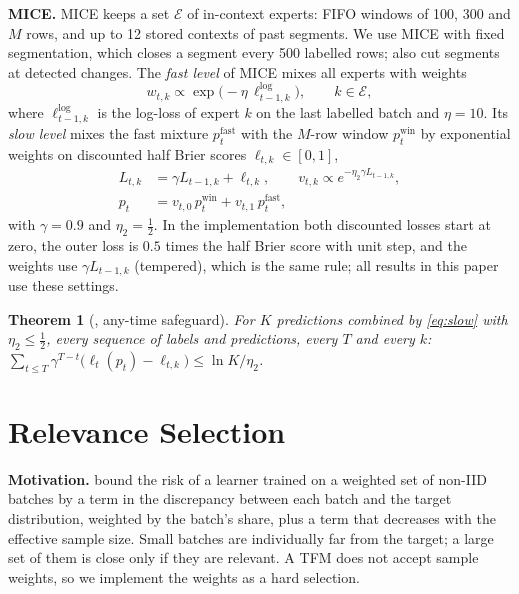 \documentclass{article}
\theoremstyle{plain}
\newtheorem{theorem}{Theorem}
\theoremstyle{definition}
\theoremstyle{remark}
\newcommand{\mice}{\textsc{MICE}}
\begin{document}
\textbf{\mice{}.} \mice{} \citep{mice2026} keeps a set $\mathcal E$ of in-context experts: FIFO windows of 100, 300 and
$M$ rows, and up to 12 stored contexts of past segments. We use \mice{} with fixed segmentation, which closes a
segment every 500 labelled rows; \citet{mice2026} also cut segments at detected changes. The \emph{fast level} of \mice{} mixes all experts with weights
\begin{equation}\label{eq:fast}
  w_{t,k}\propto\exp\bigl(-\eta\,\ell^{\log}_{t-1,k}\bigr),\qquad k\in\mathcal E,
\end{equation}
where $\ell^{\log}_{t-1,k}$ is the log-loss of expert $k$ on the last labelled batch and $\eta=10$. Its \emph{slow
level} mixes the fast mixture $p^{\mathrm{fast}}_t$ with the $M$-row window $p^{\mathrm{win}}_t$ by exponential
weights on discounted half Brier scores $\ell_{t,k}\in[0,1]$,
\begin{equation}\label{eq:slow}
  \begin{aligned}
  L_{t,k}&=\gamma L_{t-1,k}+\ell_{t,k},\qquad v_{t,k}\propto e^{-\eta_2\gamma L_{t-1,k}},\\
  p_t&=v_{t,0}\,p^{\mathrm{win}}_t+v_{t,1}\,p^{\mathrm{fast}}_t,
  \end{aligned}
\end{equation}
with $\gamma=0.9$ and $\eta_2=\tfrac12$. In the implementation both discounted losses start at zero, the outer loss
is $0.5$ times the half Brier score with unit step, and the weights use $\gamma L_{t-1,k}$ (tempered), which is the
same rule; all results in this paper use these settings.

\begin{theorem}[\citealp{mice2026}, any-time safeguard]\label{thm:outer}
For $K$ predictions combined by \eqref{eq:slow} with $\eta_2\le\tfrac12$, every sequence of labels and predictions,
every $T$ and every $k$:
$\sum_{t\le T}\gamma^{T-t}\bigl(\ell_t(p_t)-\ell_{t,k}\bigr)\le\ln K/\eta_2$.
\end{theorem}

\section{Relevance Selection}
\label{sec:duo}

\textbf{Motivation.} \citet{zhao2024wnb} bound the risk of a learner trained on a weighted set of non-IID batches by a
term in the discrepancy between each batch and the target distribution, weighted by the batch's share, plus a term
that decreases with the effective sample size. Small batches are individually far from the target; a large set of
them is close only if they are relevant. A TFM does not accept sample weights, so we implement the weights as a hard selection.
\end{document}
